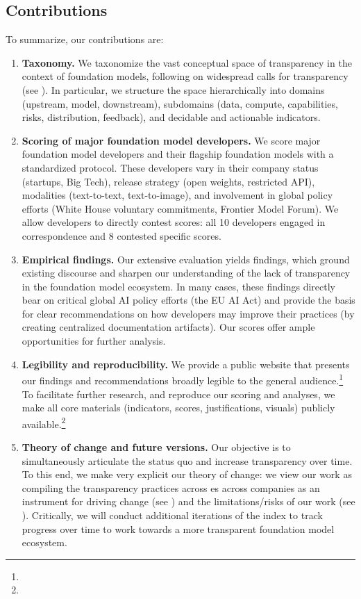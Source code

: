 \hypertarget{contributions}{\subsection{Contributions}}
\label{sec:contributions}
To summarize, our contributions are:
\begin{enumerate}
\item \textbf{Taxonomy.}
We taxonomize the vast conceptual space of transparency in the context of foundation models, following on widespread calls for transparency (see ).
In particular, we structure the space hierarchically into \numdomains domains (\ie upstream, model, downstream), \numsubdomains subdomains (\eg data, compute, capabilities, risks, distribution, feedback), and \numindicators decidable and actionable indicators.  
\item \textbf{Scoring of major foundation model developers.}
We score \numcompanies major foundation model developers and their flagship foundation models with a standardized protocol.
These developers vary in their company status (\eg startups, Big Tech), release strategy (\eg open weights, restricted API), modalities (\eg text-to-text, text-to-image), and involvement in global policy efforts (\eg White House voluntary commitments, Frontier Model Forum).
We allow developers to directly contest scores: all 10 developers engaged in correspondence and 8 contested specific scores.
\item \textbf{Empirical findings.}
Our extensive evaluation yields \numtotalfindings findings, which ground existing discourse and sharpen our understanding of the lack of transparency in the foundation model ecosystem.
In many cases, these findings directly bear on critical global AI policy efforts (\eg the EU AI Act) and provide the basis for clear recommendations on how developers may improve their practices (\eg by creating centralized documentation artifacts).
Our scores offer ample opportunities for further analysis. 
\item \textbf{Legibility and reproducibility.}
We provide a public website that presents our findings and recommendations broadly legible to the general audience.\footnote{\indexUrl}
To facilitate further research, and reproduce our scoring and analyses, we make all core materials (\eg indicators, scores, justifications, visuals) publicly available.\footnote{\materialsUrl}
\item \textbf{Theory of change and future versions.}
Our objective is to simultaneously articulate the status quo and increase transparency over time.
To this end, we make very explicit our theory of change: we view our work as compiling the transparency practices across es across companies as an instrument for driving change (see ) and the limitations/risks of our work (see ).
Critically, we will conduct additional iterations of the index to track progress over time to work towards a more transparent foundation model ecosystem.
\end{enumerate}
\clearpage